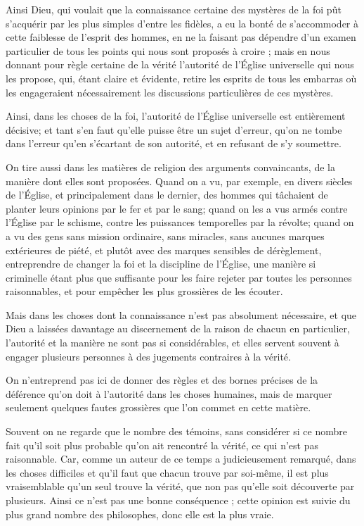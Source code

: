 Ainsi Dieu, qui voulait que la connaissance certaine des mystères de la foi pût s'acquérir par les plus simples d'entre les fidèles, a eu la bonté de s'accommoder à cette faiblesse de l'esprit des hommes, en ne la faisant pas dépendre d'un examen particulier de tous les points qui nous sont proposés à croire ; mais en nous donnant pour règle certaine de la vérité l'autorité de l'Église universelle qui nous les propose, qui, étant claire et évidente, retire les esprits de tous les embarras où les engageraient nécessairement les discussions particulières de ces mystères.

Ainsi, dans les choses de la foi, l'autorité de l'Église universelle est entièrement décisive; et tant s'en faut qu'elle puisse être un sujet d'erreur, qu'on ne tombe dans l'erreur qu'en s'écartant de son autorité, et en refusant de s'y soumettre.

On tire aussi dans les matières de religion des arguments convaincants, de la manière dont elles sont proposées. Quand on a vu, par exemple, en divers siècles de l'Église, et principalement dans le dernier, des hommes qui tâchaient de planter leurs opinions par le fer et par le sang; quand on les a vus armés contre l'Église par le schisme, contre les puissances temporelles par la révolte; quand on a vu des gens sans mission ordinaire, sans miracles, sans aucunes marques extérieures de piété, et plutôt avec des marques sensibles de dérèglement, entreprendre de changer la foi et la discipline de l'Église, une manière si criminelle étant plus que suffisante pour les faire rejeter par toutes les personnes raisonnables, et pour empêcher les plus grossières de les écouter.

Mais dans les choses dont la connaissance n'est pas absolument nécessaire, et que Dieu a laissées davantage au discernement de la raison de chacun en particulier, l'autorité et la manière ne sont pas si considérables, et elles servent souvent à engager plusieurs personnes à des jugements contraires à la vérité.

On n'entreprend pas ici de donner des règles et des bornes précises de la déférence qu'on doit à l'autorité dans les choses humaines, mais de marquer seulement quelques fautes grossières que l'on commet en cette matière.

Souvent on ne regarde que le nombre des témoins, sans considérer si ce nombre fait qu'il soit plus probable qu'on ait rencontré la vérité, ce qui n'est pas raisonnable. Car, comme un auteur de ce temps a judicieusement remarqué, dans les choses difficiles et qu'il faut que chacun trouve par soi-même, il est plus vraisemblable qu'un seul trouve la vérité, que non pas qu'elle soit découverte par plusieurs. Ainsi ce n'est pas une bonne conséquence ; cette opinion est suivie du plus grand nombre des philosophes, donc elle est la plus vraie.

